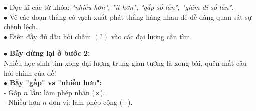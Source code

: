 \documentclass[14pt,a4paper,oneside]{extbook}
\begin{document}
\noindent
\begin{minipage}[t]{0.54\textwidth}
  \begin{tcolorbox}[
    enhanced,
    title={\footnotesize\bfseries\color{white}\faKey\ Kĩ năng tóm tắt bằng sơ đồ đoạn thẳng},
    colback=green!3!white,
    colframe=green!60!black,
    arc=2.5mm, boxrule=0.8pt, top=1.8mm, bottom=1.8mm, left=2.2mm, right=2.2mm
  ]
    \footnotesize
    $\bullet$ Đọc kĩ các từ khóa: \textit{"nhiều hơn", "ít hơn", "gấp số lần", "giảm đi số lần"}.\\
    $\bullet$ Vẽ các đoạn thẳng có vạch xuất phát thẳng hàng nhau để dễ dàng quan sát sự chênh lệch.\\
    $\bullet$ Điền đầy đủ dấu hỏi chấm $(?)$ vào các đại lượng cần tìm.
  \end{tcolorbox}
\end{minipage}%
\hfill
\begin{minipage}[t]{0.44\textwidth}
  \begin{tcolorbox}[
    enhanced,
    title={\footnotesize\bfseries\color{white}\faExclamationTriangle\ Mẹo tránh bẫy trắc nghiệm},
    colback=red!2!white,
    colframe=red!70!black,
    arc=2.5mm, boxrule=0.8pt, top=1.8mm, bottom=1.8mm, left=2.2mm, right=2.2mm
  ]
    \footnotesize
    $\bullet$ \textbf{Bẫy dừng lại ở bước 2:}\\
    Nhiều học sinh tìm xong đại lượng trung gian tưởng là xong bài, quên mất câu hỏi chính của đề!\\
    $\bullet$ \textbf{Bẫy "gấp" vs "nhiều hơn":}\\
    - Gấp $n$ lần: làm phép nhân ($\times$).\\
    - Nhiều hơn $n$ đơn vị: làm phép cộng ($+$).
  \end{tcolorbox}
\end{minipage}
\end{document}
